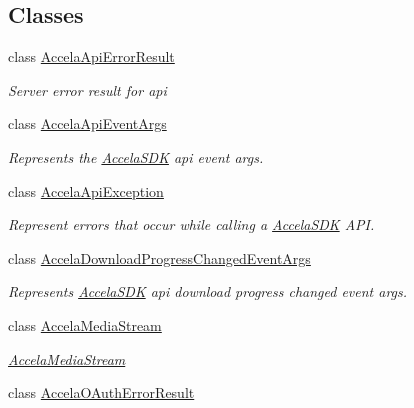 \subsection*{Classes}
\begin{DoxyCompactItemize}
\item 
class \hyperlink{class_accela_1_1_windows_store_s_d_k_1_1_accela_api_error_result}{Accela\+Api\+Error\+Result}
\begin{DoxyCompactList}\small\item\em Server error result for api \end{DoxyCompactList}\item 
class \hyperlink{class_accela_1_1_windows_store_s_d_k_1_1_accela_api_event_args}{Accela\+Api\+Event\+Args}
\begin{DoxyCompactList}\small\item\em Represents the \hyperlink{class_accela_1_1_windows_store_s_d_k_1_1_accela_s_d_k}{Accela\+S\+D\+K} api event args. \end{DoxyCompactList}\item 
class \hyperlink{class_accela_1_1_windows_store_s_d_k_1_1_accela_api_exception}{Accela\+Api\+Exception}
\begin{DoxyCompactList}\small\item\em Represent errors that occur while calling a \hyperlink{class_accela_1_1_windows_store_s_d_k_1_1_accela_s_d_k}{Accela\+S\+D\+K} A\+P\+I. \end{DoxyCompactList}\item 
class \hyperlink{class_accela_1_1_windows_store_s_d_k_1_1_accela_download_progress_changed_event_args}{Accela\+Download\+Progress\+Changed\+Event\+Args}
\begin{DoxyCompactList}\small\item\em Represents \hyperlink{class_accela_1_1_windows_store_s_d_k_1_1_accela_s_d_k}{Accela\+S\+D\+K} api download progress changed event args. \end{DoxyCompactList}\item 
class \hyperlink{class_accela_1_1_windows_store_s_d_k_1_1_accela_media_stream}{Accela\+Media\+Stream}
\begin{DoxyCompactList}\small\item\em \hyperlink{class_accela_1_1_windows_store_s_d_k_1_1_accela_media_stream}{Accela\+Media\+Stream} \end{DoxyCompactList}\item 
class \hyperlink{class_accela_1_1_windows_store_s_d_k_1_1_accela_o_auth_error_result}{Accela\+O\+Auth\+Error\+Result}

\end{DoxyCompactItemize}
